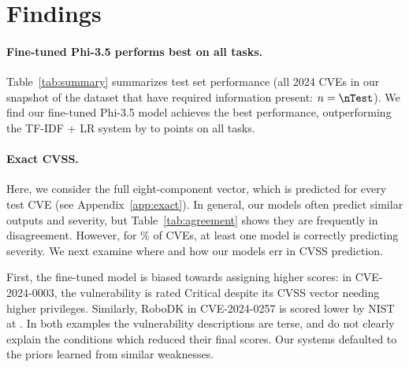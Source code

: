 \section{Findings}\label{sec:findings}



\paragraph{Fine-tuned Phi-3.5 performs best on all tasks.}
Table~\ref{tab:summary} summarizes test set performance (all 2024 CVEs in our snapshot of the dataset that have required information present: $n = \nTest$).
We find our fine-tuned Phi-3.5 model achieves the best performance, outperforming the TF-IDF + LR system by \nDiffLRfSev{} to \nDiffLRfVec{} points on all tasks.

\paragraph{Exact CVSS.}
Here, we consider the full eight-component vector, which is predicted for every test CVE (see Appendix~\ref{app:exact}).
In general, our models often predict similar outputs and severity, but Table~\ref{tab:agreement} shows they are frequently in disagreement.
However, for \nEitherSev\% of CVEs, at least one model is correctly predicting severity.
We next examine where and how our models err in CVSS prediction.



First, the fine-tuned model is biased towards assigning higher scores: in CVE-2024-0003, the vulnerability is rated Critical despite its CVSS vector needing higher privileges.
Similarly, RoboDK in CVE-2024-0257 is scored lower by NIST at \nExRoboDKTrue.
In both examples the vulnerability descriptions are terse, and do not clearly explain the conditions which reduced their final scores.
Our systems defaulted to the priors learned from similar weaknesses.

